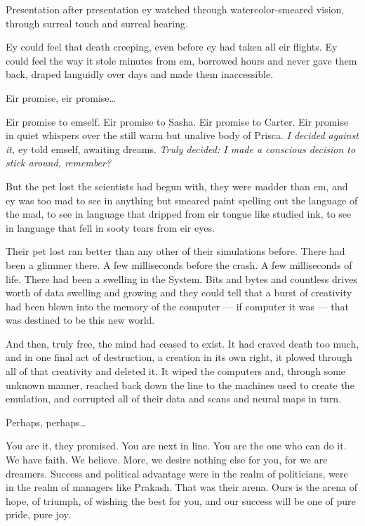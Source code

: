Presentation after presentation ey watched through watercolor-smeared vision, through surreal touch and surreal hearing.

Ey could feel that death creeping, even before ey had taken all eir flights. Ey could feel the way it stole minutes from em, borrowed hours and never gave them back, draped languidly over days and made them inaccessible.

Eir promise, eir promise\ldots{}

Eir promise to emself. Eir promise to Sasha. Eir promise to Carter. Eir promise in quiet whispers over the still warm but unalive body of Prisca. \emph{I decided against it,} ey told emself, awaiting dreams. \emph{Truly decided: I made a conscious decision to stick around, remember?}

But the pet lost the scientists had begun with, they were madder than em, and ey was too mad to see in anything but smeared paint spelling out the language of the mad, to see in language that dripped from eir tongue like studied ink, to see in language that fell in sooty tears from eir eyes.

Their pet lost ran better than any other of their simulations before. There had been a glimmer there. A few milliseconds before the crash. A few milliseconds of life. There had been a swelling in the System. Bits and bytes and countless drives worth of data swelling and growing and they could tell that a burst of creativity had been blown into the memory of the computer — if computer it was — that was destined to be this new world.

And then, truly free, the mind had ceased to exist. It had craved death too much, and in one final act of destruction, a creation in its own right, it plowed through all of that creativity and deleted it. It wiped the computers and, through some unknown manner, reached back down the line to the machines used to create the emulation, and corrupted all of their data and scans and neural maps in turn.

Perhaps, perhaps\ldots

You are it, they promised. You are next in line. You are the one who can do it. We have faith. We believe. More, we desire nothing else for you, for we are dreamers. Success and political advantage were in the realm of politicians, were in the realm of managers like Prakash. That was their arena. Ours is the arena of hope, of triumph, of wishing the best for you, and our success will be one of pure pride, pure joy.

